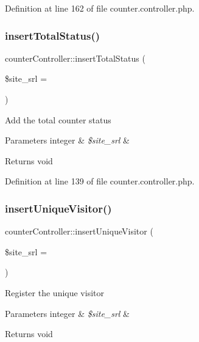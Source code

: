 Definition at line 162 of file counter.\+controller.\+php.

\hypertarget{classcounterController_aae80270e1f6fae002f8e5ae4a0a670d7}{}\label{classcounterController_aae80270e1f6fae002f8e5ae4a0a670d7} 
\subsubsection{\texorpdfstring{insert\+Total\+Status()}{insertTotalStatus()}}
{\footnotesize\ttfamily counter\+Controller\+::insert\+Total\+Status (\begin{DoxyParamCaption}\item[{}]{\$site\+\_\+srl = {} }\end{DoxyParamCaption})}

Add the total counter status


\begin{DoxyParams}[1]{Parameters}
integer & {\em \$site\+\_\+srl} & \\
\hline
\end{DoxyParams}
\begin{DoxyReturn}{Returns}
void 
\end{DoxyReturn}


Definition at line 139 of file counter.\+controller.\+php.

\hypertarget{classcounterController_a5801722c5ab169c3d698fa596686c459}{}\label{classcounterController_a5801722c5ab169c3d698fa596686c459} 
\subsubsection{\texorpdfstring{insert\+Unique\+Visitor()}{insertUniqueVisitor()}}
{\footnotesize\ttfamily counter\+Controller\+::insert\+Unique\+Visitor (\begin{DoxyParamCaption}\item[{}]{\$site\+\_\+srl = {} }\end{DoxyParamCaption})}

Register the unique visitor


\begin{DoxyParams}[1]{Parameters}
integer & {\em \$site\+\_\+srl} & \\
\hline
\end{DoxyParams}
\begin{DoxyReturn}{Returns}
void 
\end{DoxyReturn}



